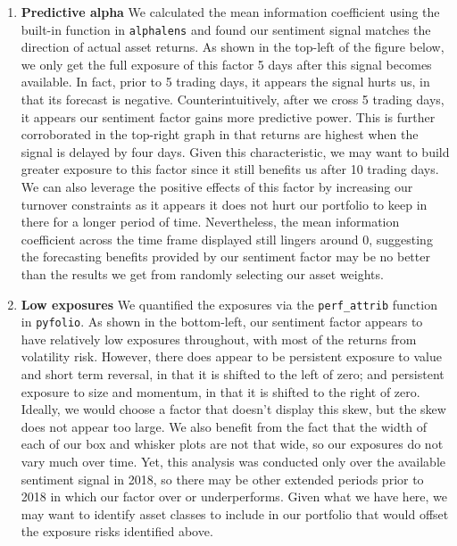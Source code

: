\documentclass[11,]{article}
\begin{document}
\begin{enumerate}
\def\labelenumi{\arabic{enumi}.}
\item
  \textbf{Predictive alpha} We calculated the mean information
  coefficient using the built-in function in \texttt{alphalens} and
  found our sentiment signal matches the direction of actual asset
  returns. As shown in the top-left of the figure below, we only get the
  full exposure of this factor 5 days after this signal becomes
  available. In fact, prior to 5 trading days, it appears the signal
  hurts us, in that its forecast is negative. Counterintuitively, after
  we cross 5 trading days, it appears our sentiment factor gains more
  predictive power. This is further corroborated in the top-right graph
  in that returns are highest when the signal is delayed by four days.
  Given this characteristic, we may want to build greater exposure to
  this factor since it still benefits us after 10 trading days. We can
  also leverage the positive effects of this factor by increasing our
  turnover constraints as it appears it does not hurt our portfolio to
  keep in there for a longer period of time. Nevertheless, the mean
  information coefficient across the time frame displayed still lingers
  around 0, suggesting the forecasting benefits provided by our
  sentiment factor may be no better than the results we get from
  randomly selecting our asset weights.
\item
  \textbf{Low exposures} We quantified the exposures via the
  \texttt{perf\_attrib} function in \texttt{pyfolio}. As shown in the
  bottom-left, our sentiment factor appears to have relatively low
  exposures throughout, with most of the returns from volatility risk.
  However, there does appear to be persistent exposure to value and
  short term reversal, in that it is shifted to the left of zero; and
  persistent exposure to size and momentum, in that it is shifted to the
  right of zero. Ideally, we would choose a factor that doesn't display
  this skew, but the skew does not appear too large. We also benefit
  from the fact that the width of each of our box and whisker plots are
  not that wide, so our exposures do not vary much over time. Yet, this
  analysis was conducted only over the available sentiment signal in
  2018, so there may be other extended periods prior to 2018 in which
  our factor over or underperforms. Given what we have here, we may want
  to identify asset classes to include in our portfolio that would
  offset the exposure risks identified above.
\end{enumerate}
\end{document}
